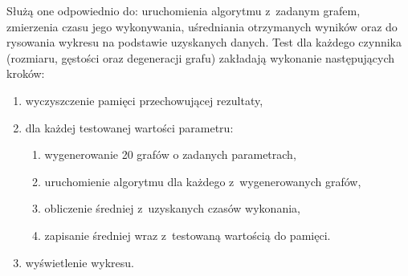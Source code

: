 \documentclass[11pt,a4paper]{article}
\begin{document}
Służą one odpowiednio do: uruchomienia algorytmu z~zadanym grafem, zmierzenia czasu jego wykonywania, uśredniania otrzymanych wyników oraz do rysowania wykresu na podstawie uzyskanych danych. Test dla każdego czynnika (rozmiaru, gęstości oraz degeneracji grafu) zakładają wykonanie następujących kroków:

\begin{enumerate}
  \item wyczyszczenie pamięci przechowującej rezultaty,
  \item dla każdej testowanej wartości parametru:
  \begin{enumerate}
    \item wygenerowanie 20 grafów o zadanych parametrach,
    \item uruchomienie algorytmu dla każdego z~wygenerowanych grafów,
    \item obliczenie średniej z~uzyskanych czasów wykonania,
    \item zapisanie średniej wraz z~testowaną wartością do pamięci.
  \end{enumerate}
  \item wyświetlenie wykresu.
\end{enumerate}

\newpage
\end{document}
